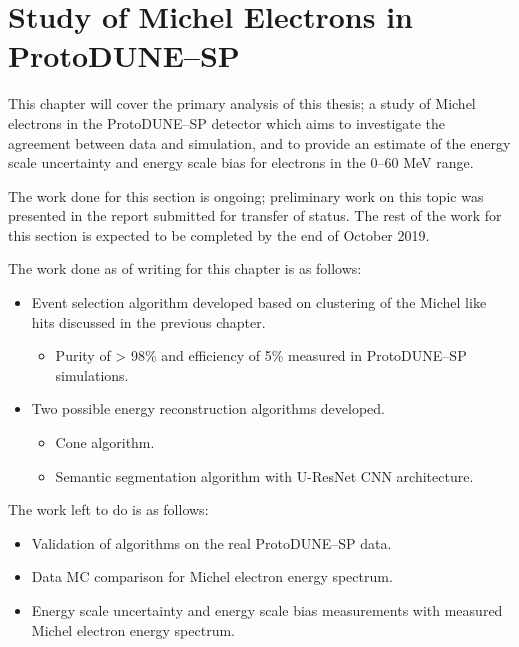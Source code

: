\chapter{\label{ch:6-michel}Study of Michel Electrons in ProtoDUNE--SP} 

\minitoc

This chapter will cover the primary analysis of this thesis; a study of Michel
electrons in the ProtoDUNE--SP detector which aims to investigate the agreement
between data and simulation, and to provide an estimate of the energy scale
uncertainty and energy scale bias for electrons in the 0--60 MeV range. 

The work done for this section is ongoing; preliminary work on this topic was
presented in the report submitted for transfer of status. The rest of the work
for this section is expected to be completed by the end of October 2019.

\noindent The work done as of writing for this chapter is as follows:
\begin{itemize}[noitemsep,nolistsep]
	\item Event selection algorithm developed based on clustering of the Michel
	like hits discussed in the previous chapter.
	\begin{itemize}[noitemsep,nolistsep]
		\item Purity of > 98\% and efficiency of 5\% measured in ProtoDUNE--SP 
		simulations.
	\end{itemize}
	\item Two possible energy reconstruction algorithms developed.
	\begin{itemize}[noitemsep,nolistsep]
		\item Cone algorithm.
		\item Semantic segmentation algorithm with U-ResNet CNN architecture.
	\end{itemize}
\end{itemize}

\noindent The work left to do is as follows:
\begin{itemize}[noitemsep, nolistsep]
	\item Validation of algorithms on the real ProtoDUNE--SP data.
	\item Data MC comparison for Michel electron energy spectrum.
	\item Energy scale uncertainty and energy scale bias measurements with 
	measured Michel electron energy spectrum.
\end{itemize}

